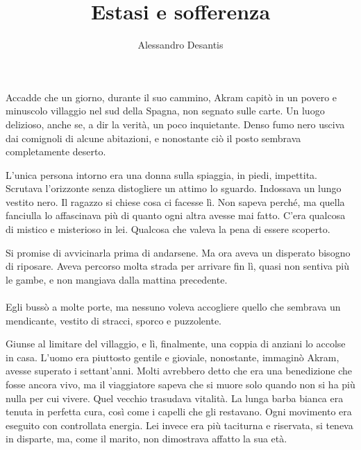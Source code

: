\documentclass[a4paper,12pt]{book}
\title{Estasi e sofferenza}
\author{Alessandro Desantis}
\date{}
\begin{document}

\maketitle


\paragraph{}
Accadde che un giorno, durante il suo cammino, Akram capitò in un povero e
minuscolo villaggio nel sud della Spagna, non segnato sulle carte. Un luogo
delizioso, anche se, a dir la verità, un poco inquietante. Denso fumo nero
usciva dai comignoli di alcune abitazioni, e nonostante ciò il posto sembrava
completamente deserto.

L'unica persona intorno era una donna sulla spiaggia, in piedi, impettita.
Scrutava l'orizzonte senza distogliere un attimo lo sguardo. Indossava un lungo
vestito nero. Il ragazzo si chiese cosa ci facesse lì. Non sapeva perché, ma
quella fanciulla lo affascinava più di quanto ogni altra avesse mai fatto.
C'era qualcosa di mistico e misterioso in lei. Qualcosa che valeva la pena di
essere scoperto.

Si promise di avvicinarla prima di andarsene. Ma ora aveva un disperato bisogno
di riposare. Aveva percorso molta strada per arrivare fin lì, quasi non sentiva
più le gambe, e non mangiava dalla mattina precedente.

\paragraph{}
Egli bussò a molte porte, ma nessuno voleva accogliere quello che sembrava un
mendicante, vestito di stracci, sporco e puzzolente.

Giunse al limitare del villaggio, e lì, finalmente, una coppia di anziani lo
accolse in casa. L'uomo era piuttosto gentile e gioviale, nonostante, immaginò
Akram, avesse superato i settant'anni. Molti avrebbero detto che era una
benedizione che fosse ancora vivo, ma il viaggiatore sapeva che si muore solo
quando non si ha più nulla per cui vivere. Quel vecchio trasudava vitalità. La
lunga barba bianca era tenuta in perfetta cura, così come i capelli che gli
restavano. Ogni movimento era eseguito con controllata energia. Lei invece era
più taciturna e riservata, si teneva in disparte, ma, come il marito, non
dimostrava affatto la sua età.
\end{document}
